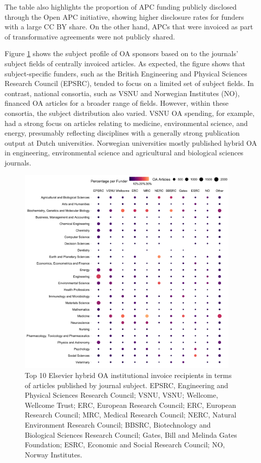 \documentclass[a4paper,man,floatsintext,longtable,noextraspace,12pt]{apa6}
\begin{document}
The table also highlights the proportion of APC funding publicly
disclosed through the Open APC initiative, showing higher disclosure
rates for funders with a large CC BY share. On the other hand, APCs that
were invoiced as part of transformative agreements were not publicly
shared.

Figure \ref{fig:field_funder_matrix} shows the subject profile of OA
sponsors based on to the journals' subject fields of centrally invoiced
articles. As expected, the figure shows that subject-specific funders,
such as the British Engineering and Physical Sciences Research Council
(EPSRC), tended to focus on a limited set of subject fields. In
contrast, national consortia, such as VSNU and Norwegian Institutes
(NO), financed OA articles for a broader range of fields. However,
within these consortia, the subject distribution also varied. VSNU OA
spending, for example, had a strong focus on articles relating to
medicine, environmental science, and energy, presumably reflecting
disciplines with a generally strong publication output at Dutch
universities. Norwegian universities mostly published hybrid OA in
engineering, environmental science and agricultural and biological
sciences journals.

\begin{figure}[H]

{\centering \includegraphics[width=0.95\textwidth]{../figure/funder_subject.png}

}

\caption{Top 10 Elsevier hybrid OA institutional invoice recipients in terms of articles published by journal subject. EPSRC, Engineering and Physical Sciences Research Council; VSNU, VSNU; Wellcome, Wellcome Trust; ERC, European Research Council; ERC, European Research Council; MRC, Medical Research Council; NERC, Natural Environment Research Council; BBSRC, Biotechnology and Biological Sciences Research Council; Gates, Bill and Melinda Gates Foundation; ESRC, Economic and Social Research Council; NO, Norway Institutes. }\label{fig:field_funder_matrix}
\end{figure}
\end{document}
